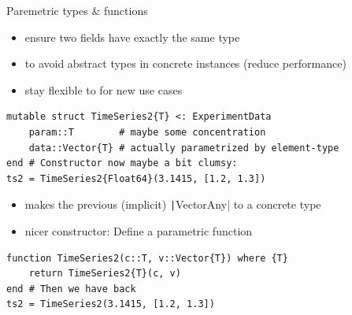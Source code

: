 \documentclass[aspectratio=169, 11pt, handout]{beamer}
\begin{document}
    \begin{frame}[fragile]{Paremetric types \& functions}
        \begin{itemize}[<+->]
            \item ensure two fields have \alert{exactly the same type}
            \item to avoid abstract types in concrete instances (reduce performance)
            \item stay flexible to for new use cases
        \end{itemize}
        \pause
        \begin{verbatim}
mutable struct TimeSeries2{T} <: ExperimentData
    param::T        # maybe some concentration
    data::Vector{T} # actually parametrized by element-type
end # Constructor now maybe a bit clumsy:
ts2 = TimeSeries2{Float64}(3.1415, [1.2, 1.3])
        \end{verbatim}
        \pause
        \begin{itemize}
            \item makes the previous (implicit) \texttt|Vector{Any}| to a concrete type
            \pause
            \item nicer constructor: Define a \alert{parametric function}
        \end{itemize}
        \begin{verbatim}
function TimeSeries2(c::T, v::Vector{T}) where {T}
    return TimeSeries2{T}(c, v)
end # Then we have back
ts2 = TimeSeries2(3.1415, [1.2, 1.3])
        \end{verbatim}
    \end{frame}
\end{document}
